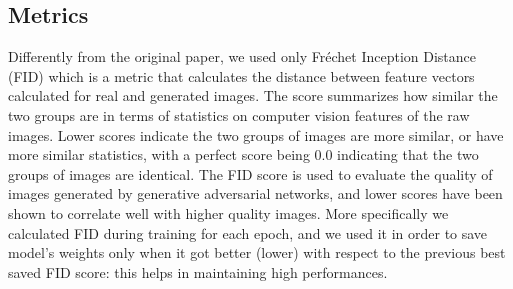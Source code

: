 \documentclass[12pt]{article}
\begin{document}
\subsection{Metrics}

Differently from the original paper, we used only Fréchet Inception Distance (FID) which
is a metric that calculates the distance between feature vectors calculated for real and 
generated images.
The score summarizes how similar the two groups are in terms of statistics on computer vision 
features of the raw images. Lower scores indicate the two groups of images are more similar, 
or have more similar statistics, with a perfect score being 0.0 indicating that the two 
groups of images are identical. The FID score is used to evaluate the quality of images 
generated by generative adversarial networks, and lower scores have been shown to correlate 
well with higher quality images. 
More specifically we calculated FID during training for each epoch, and we used it in order to
save model's weights only when it got better (lower) with respect to the previous best saved FID score:
this helps in maintaining high performances. 


\end{document}
